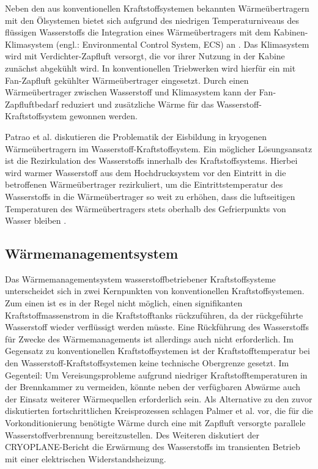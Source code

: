 Neben den aus konventionellen Kraftstoffsystemen bekannten Wärmeübertragern mit den Ölsystemen bietet sich aufgrund des niedrigen Temperaturniveaus des flüssigen Wasserstoffs die Integration eines Wärmeübertragers mit dem Kabinen-Klimasystem (engl.: Environmental Control System, ECS) an \cite{Brewer.1991}. Das Klimasystem wird mit Verdichter-Zapfluft versorgt, die vor ihrer Nutzung in der Kabine zunächst abgekühlt wird. In konventionellen Triebwerken wird hierfür ein mit Fan-Zapfluft gekühlter Wärmeübertrager eingesetzt. Durch einen Wärmeübertrager zwischen Wasserstoff und Klimasystem kann der Fan-Zapfluftbedarf reduziert und zusätzliche Wärme für das Wasserstoff-Kraftstoffsystem gewonnen werden. 

Patrao et al. \cite{Patrao.2024} diskutieren die Problematik der Eisbildung in kryogenen Wärmeübertragern im Wasserstoff-Kraftstoffsystem. Ein möglicher Lösungsansatz ist die Rezirkulation des Wasserstoffs innerhalb des Kraftstoffsystems. Hierbei wird warmer Wasserstoff aus dem Hochdrucksystem vor den Eintritt in die betroffenen Wärmeübertrager rezirkuliert, um die Eintrittstemperatur des Wasserstoffs in die Wärmeübertrager so weit zu erhöhen, dass die luftseitigen Temperaturen des Wärmeübertragers stets oberhalb des Gefrierpunkts von Wasser bleiben \cite{Brewer.1991}. 

\subsection{Wärmemanagementsystem}

Das Wärmemanagementsystem wasserstoffbetriebener Kraftstoffsysteme unterscheidet sich in zwei Kernpunkten von konventionellen Kraftstoffsystemen. Zum einen ist es in der Regel nicht möglich, einen signifikanten Kraftstoffmassenstrom in die Kraftstofftanks rückzuführen, da der rückgeführte Wasserstoff wieder verflüssigt werden müsste. Eine Rückführung des Wasserstoffs für Zwecke des Wärmemanagements ist allerdings auch nicht erforderlich. Im Gegensatz zu konventionellen Kraftstoffsystemen ist der Kraftstofftemperatur bei den Wasserstoff-Kraftstoffsystemen keine technische Obergrenze gesetzt. Im Gegenteil: Um Vereisungsprobleme aufgrund niedriger Kraftstofftemperaturen in der Brennkammer zu vermeiden, könnte neben der verfügbaren Abwärme auch der Einsatz weiterer Wärmequellen erforderlich sein. Als Alternative zu den zuvor diskutierten fortschrittlichen Kreisprozessen schlagen Palmer et al. \cite{PalmerChloeJWhurrJohnR.2024}  vor, die für die Vorkonditionierung benötigte Wärme durch eine mit Zapfluft versorgte parallele Wasserstoffverbrennung bereitzustellen. Des Weiteren diskutiert der CRYOPLANE-Bericht \cite{Scholz.2003} die Erwärmung des Wasserstoffs im transienten Betrieb mit einer elektrischen Widerstandsheizung.

